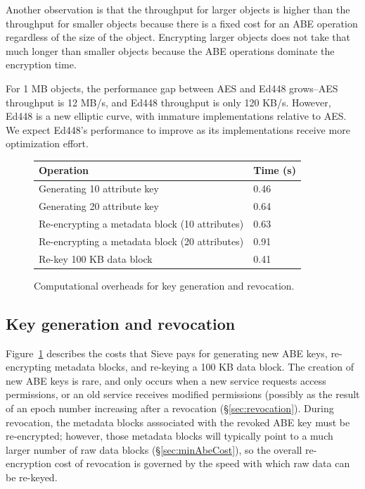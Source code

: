 Another observation is that the throughput for
larger objects is higher than the
throughput for smaller objects because
there is a fixed cost for an ABE operation regardless
of the size of the object. Encrypting larger objects
does not take that much longer than smaller
objects because the ABE operations dominate 
the encryption time.

For 1 MB objects, the performance gap between
AES and Ed448 grows--AES throughput is 12 MB/s,
and Ed448 throughput is only 120 KB/s. However,
Ed448 is a new elliptic curve, with immature
implementations relative to AES. We expect
Ed448's performance to improve as its
implementations receive more optimization
effort.

\begin{figure}
\centering
\begin{tabular}{ |p{5.5cm}|p{1.5cm}| }
\hline
Operation & Time (s)\\ \hline
Generating 10 attribute key &  0.46\\ \hline
Generating 20 attribute key & 0.64\\ \hline
Re-encrypting a metadata block (10 attributes) & 0.63 \\ \hline
Re-encrypting a metadata block (20 attributes) & 0.91 \\ \hline
Re-key 100 KB data block & 0.41 \\ \hline
\end{tabular}
\caption{Computational overheads for key generation and revocation.}
\label{fig:sievekey}
\end{figure}

\subsection{Key generation and revocation}
Figure~\ref{fig:sievekey} describes the costs
that Sieve pays for generating new ABE keys,
re-encrypting metadata blocks, and re-keying
a 100 KB data block. The creation of new ABE
keys is rare, and only occurs when a new service
requests access permissions, or an old service
receives modified permissions (possibly as the
result of an epoch number increasing after a
revocation (\S\ref{sec:revocation}). During
revocation, the metadata blocks asssociated
with the revoked ABE key must be re-encrypted;
however, those metadata blocks will typically
point to a much larger number of raw data
blocks (\S\ref{sec:minAbeCost}), so the overall
re-encryption cost of revocation is governed
by the speed with which raw data can be re-keyed.

